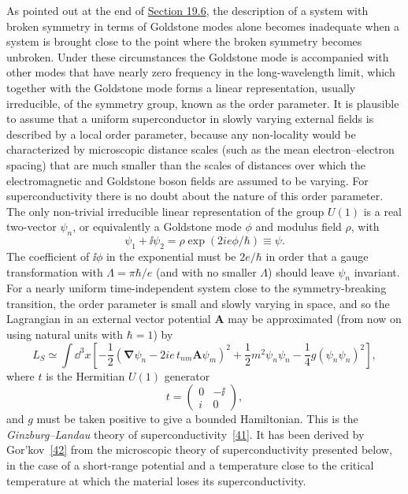 As pointed out at the end of \hyperref[sec:19.6]{Section 19.6}, the description of a system with broken symmetry in terms of Goldstone modes alone becomes inadequate when a system is brought close to the point where the broken symmetry becomes unbroken. Under these circumstances the Goldstone mode is accompanied with other modes that have nearly zero frequency in the long-wavelength limit, which together with the Goldstone mode forms a linear representation, usually irreducible, of the symmetry group, known as the order parameter. It is plausible to assume that a uniform superconductor in slowly varying external fields is described by a local order parameter, because any non-locality would be characterized by microscopic distance scales (such as the mean electron--electron spacing) that are much smaller than the scales of distances over which the electromagnetic and Goldstone boson fields are assumed to be varying. For superconductivity there is no doubt about the nature of this order parameter. The only non-trivial irreducible linear representation of the group $U(1)$ is a real two-vector $\psi_n$, or equivalently a Goldstone mode $\phi$ and modulus field $\rho$, with
\begin{equation}
\psi_1+\ii\psi_2=\rho\exp(2ie\phi/\hbar)\equiv\psi.
\tag{21.6.20}\label{eq:21.6.20}
\end{equation}
The coefficient of $\ii\phi$ in the exponential must be $2e/\hbar$ in order that a gauge transformation with $\Lambda=\pi\hbar/e$ (and with no smaller $\Lambda$) should leave $\psi_n$ invariant. For a nearly uniform time-independent system close to the symmetry-breaking transition, the order parameter is small and slowly varying in space, and so the Lagrangian in an external vector potential $\mathbf A$ may be approximated (from now on using natural units with $\hbar=1$) by
\begin{equation}
L_S\simeq\int \dd^3x\left[
-\frac12\left(
\boldsymbol\nabla\psi_n-2ie\,t_{nm}\mathbf A\psi_m
\right)^2
+\frac12m^2\psi_n\psi_n
-\frac14g(\psi_n\psi_n)^2
\right],
\tag{21.6.21}\label{eq:21.6.21}
\end{equation}
where $t$ is the Hermitian $U(1)$ generator
\[
t=\begin{pmatrix}
0&-\ii\\
i&0
\end{pmatrix},
\]
and $g$ must be taken positive to give a bounded Hamiltonian. This is the \emph{Ginzburg--Landau} theory of superconductivity~\hyperref[ch21-ref-41]{[41]}. It has been derived by Gor'kov~\hyperref[ch21-ref-42]{[42]} from the microscopic theory of superconductivity presented below, in the case of a short-range potential and a temperature close to the critical temperature at which the material loses its superconductivity.

